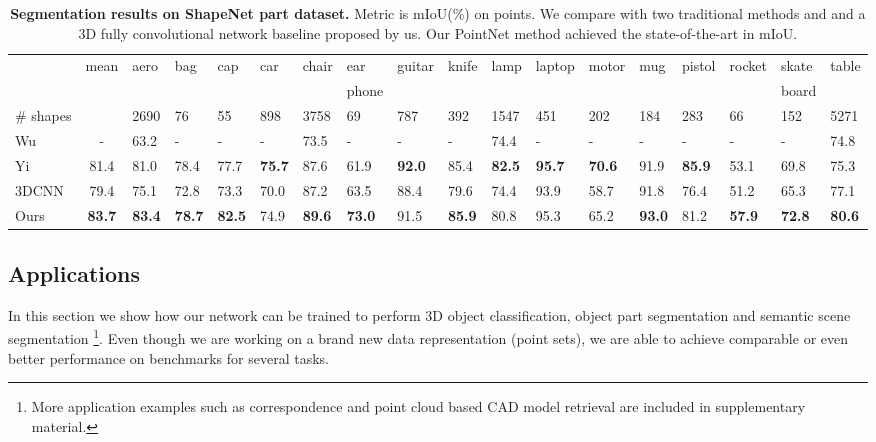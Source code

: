 \begin{table}[th!]
    \small
    \centering
    \begin{tabular}[width=\linewidth]{l|c|p{0.5cm}p{0.4cm}p{0.4cm}p{0.4cm}p{0.5cm}p{0.6cm}p{0.5cm}p{0.5cm}p{0.5cm}p{0.6cm}p{0.6cm}p{0.3cm}p{0.5cm}p{0.6cm}p{0.6cm}p{0.6cm}}
    \hline
    ~        & mean & aero & bag & cap & car & chair & ear & guitar & knife & lamp & laptop & motor & mug & pistol & rocket & skate & table \\ 
    &   & &  &  &  &  & phone &  &   &  &  & &    &    &    & board &  \\ \hline
    \# shapes & & 2690 & 76 & 55 & 898 & 3758 & 69 & 787 & 392 & 1547 & 451 & 202 & 184 & 283 & 66 & 152 & 5271 \\ \hline
    Wu~\cite{Wu2014248} &  -  & 63.2  & - &      -    & -   & 73.5 & - &    - &    - &     74.4  & -    & - &   -   &   -   &   - & -  &  74.8 \\
    Yi~\cite{Yi16} & 81.4 & 81.0 & 78.4 & 77.7 & \textbf{75.7} & 87.6 & 61.9 & \textbf{92.0} & 85.4 & \textbf{82.5} & \textbf{95.7} & \textbf{70.6} & 91.9 & \textbf{85.9} & 53.1 & 69.8 & 75.3 \\ \hline
    3DCNN & 79.4 & 75.1 & 72.8 & 73.3 & 70.0 & 87.2 & 63.5 & 88.4 & 79.6 & 74.4 & 93.9 & 58.7 & 91.8 & 76.4 & 51.2 & 65.3 & 77.1 \\ 
    Ours & \textbf{83.7} & \textbf{83.4} & \textbf{78.7} & \textbf{82.5} & 74.9 & \textbf{89.6} & \textbf{73.0} & 91.5 & \textbf{85.9} & 80.8 & 95.3 & 65.2 & \textbf{93.0} & 81.2 & \textbf{57.9} & \textbf{72.8} & \textbf{80.6} \\ \hline
    \end{tabular}
    \caption{\textbf{Segmentation results on ShapeNet part dataset.} Metric is mIoU(\%) on points. We compare with two traditional methods \cite{Wu2014248} and \cite{Yi16} and a 3D fully convolutional network baseline proposed by us. Our PointNet method achieved the state-of-the-art in mIoU.}
    \label{tab:segmentation}
\end{table}



\subsection{Applications}
\label{sec:application}
In this section we show how our network can be trained to perform 3D object classification, object part segmentation and semantic scene segmentation  \footnote{More application examples such as correspondence and point cloud based CAD model retrieval are included in supplementary material.}. Even though we are working on a brand new data representation (point sets), we are able to achieve comparable or even better performance on benchmarks for several tasks.

